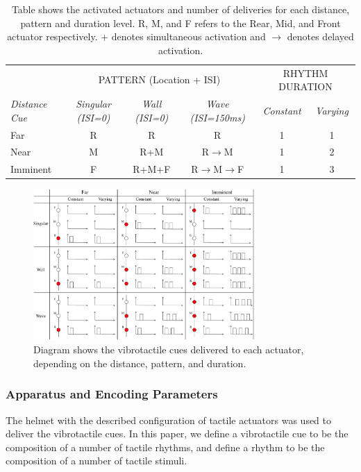 \documentclass{mpaper}
\begin{document}
\begin{table}[h]
    \centering
    \begin{tabular}{l||c|c|c||c|c}
        & \multicolumn{3}{c||}{PATTERN (Location + ISI)} & \multicolumn{2}{c}{RHYTHM DURATION}\\ \cline{2-6} 
        \emph{Distance Cue} & \emph{Singular (ISI=0)} & \emph{Wall (ISI=0)} & \emph{Wave (ISI=150ms)} & \emph{Constant} & \emph{Varying} \\ \hline
        Far & R & R & R & 1 & 1\\ 
        Near & M & R+M & R$\rightarrow$M & 1 & 2\\ 
        Imminent & F & R+M+F & R$\rightarrow$M$\rightarrow$F & 1 & 3\\ 
    \end{tabular}
    \caption{Table shows the activated actuators and number of deliveries for each distance, pattern and duration level. R, M, and F refers to the Rear, Mid, and Front actuator respectively. + denotes simultaneous activation and $\rightarrow$ denotes delayed activation.}
    \label{tab:location}
\end{table}

\begin{figure}[h]
    \centering
    \includegraphics[width=0.75\textwidth]{images/cue-table.pdf}
    \caption{Diagram shows the vibrotactile cues delivered to each actuator, depending on the distance, pattern, and duration.}
    \label{fig:cue-table}
\end{figure}



\subsubsection{Apparatus and Encoding Parameters}\label{sec:apparatus}
The helmet with the described configuration of tactile actuators was used to deliver the vibrotactile cues. In this paper, we define a vibrotactile cue to be the composition of a number of tactile rhythms, and define a rhythm to be the composition of a number of tactile stimuli.
\end{document}
